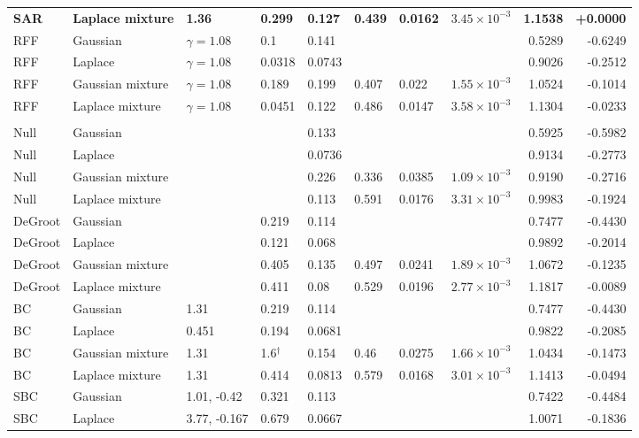 \begin{longtable}{llllllllrr}
\textbf{SAR} & \textbf{Laplace mixture} & \textbf{1.36} & \textbf{0.299} & \textbf{0.127} & \textbf{0.439} & \textbf{0.0162} & \textbf{$3.45\times10^{-3}$} & \textbf{1.1538} & \textbf{+0.0000} \\
RFF & Gaussian & $\gamma=1.08$ & 0.1 & 0.141 &  &  &  & 0.5289 & -0.6249 \\
RFF & Laplace & $\gamma=1.08$ & 0.0318 & 0.0743 &  &  &  & 0.9026 & -0.2512 \\
RFF & Gaussian mixture & $\gamma=1.08$ & 0.189 & 0.199 & 0.407 & 0.022 & $1.55\times10^{-3}$ & 1.0524 & -0.1014 \\
RFF & Laplace mixture & $\gamma=1.08$ & 0.0451 & 0.122 & 0.486 & 0.0147 & $3.58\times10^{-3}$ & 1.1304 & -0.0233 \\
\midrule
\multicolumn{10}{l}{\adamsMid{}} \\
Null & Gaussian &  &  & 0.133 &  &  &  & 0.5925 & -0.5982 \\
Null & Laplace &  &  & 0.0736 &  &  &  & 0.9134 & -0.2773 \\
Null & Gaussian mixture &  &  & 0.226 & 0.336 & 0.0385 & $1.09\times10^{-3}$ & 0.9190 & -0.2716 \\
Null & Laplace mixture &  &  & 0.113 & 0.591 & 0.0176 & $3.31\times10^{-3}$ & 0.9983 & -0.1924 \\
DeGroot & Gaussian &  & 0.219 & 0.114 &  &  &  & 0.7477 & -0.4430 \\
DeGroot & Laplace &  & 0.121 & 0.068 &  &  &  & 0.9892 & -0.2014 \\
DeGroot & Gaussian mixture &  & 0.405 & 0.135 & 0.497 & 0.0241 & $1.89\times10^{-3}$ & 1.0672 & -0.1235 \\
DeGroot & Laplace mixture &  & 0.411 & 0.08 & 0.529 & 0.0196 & $2.77\times10^{-3}$ & 1.1817 & -0.0089 \\
BC & Gaussian & 1.31 & 0.219 & 0.114 &  &  &  & 0.7477 & -0.4430 \\
BC & Laplace & 0.451 & 0.194 & 0.0681 &  &  &  & 0.9822 & -0.2085 \\
BC & Gaussian mixture & 1.31 & 1.6$^{\dagger}$ & 0.154 & 0.46 & 0.0275 & $1.66\times10^{-3}$ & 1.0434 & -0.1473 \\
BC & Laplace mixture & 1.31 & 0.414 & 0.0813 & 0.579 & 0.0168 & $3.01\times10^{-3}$ & 1.1413 & -0.0494 \\
SBC & Gaussian & 1.01, -0.42 & 0.321 & 0.113 &  &  &  & 0.7422 & -0.4484 \\
SBC & Laplace & 3.77, -0.167 & 0.679 & 0.0667 &  &  &  & 1.0071 & -0.1836 \\

\end{longtable}
